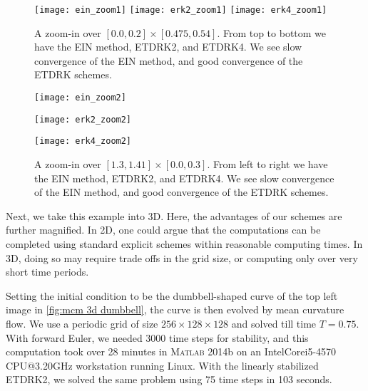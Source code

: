 \begin{figure}[htb!]
        \centering
\texttt{[image: ein\_zoom1]}
\texttt{[image: erk2\_zoom1]}
\texttt{[image: erk4\_zoom1]}
\caption[{A zoom-in over $ [0.0,0.2]\times [0.475,0.54]$ to inspect convergence.}]{A zoom-in over $[0.0, 0.2]\times [0.475, 0.54]$. From top to bottom we have the EIN method, ETDRK2, and ETDRK4. We see slow convergence of the EIN method, and good convergence of the ETDRK schemes.}
\label{fig:mcm zoom in 1}
\end{figure}

\begin{figure}[htb!]
        \centering
\begin{minipage}{0.30\textwidth}
        \texttt{[image: ein\_zoom2]}
\end{minipage}
\begin{minipage}{0.30\textwidth}
        \texttt{[image: erk2\_zoom2]}
\end{minipage}
\begin{minipage}{0.30\textwidth}
        \texttt{[image: erk4\_zoom2]}
\end{minipage}
\caption[{A zoom-in over $[1.3,1.41]\times [0.0, 0.3]$ to inspect convergence.}]{A zoom-in over $[1.3,1.41]\times [0.0, 0.3]$. From left to right we have the EIN method, ETDRK2, and ETDRK4. We see slow convergence of the EIN method, and good convergence of the ETDRK schemes.}
\label{fig:mcm zoom in 2}
\end{figure}

Next, we take this example into 3D. Here, the advantages of our schemes are further magnified. In 2D, one could argue that the computations can be completed using standard explicit schemes within reasonable computing times. In 3D, doing so may require trade offs in the grid size, or computing only over very short time periods. 

Setting the initial condition to be the dumbbell-shaped curve of the top left image in \cref{fig:mcm 3d dumbbell}, the curve is then evolved by mean curvature flow. We use a periodic grid of size $256\times 128\times 128$ and solved till time $T=0.75$. With forward Euler, we needed $3000$ time steps for stability, and this computation took over 28 minutes in \textsc{Matlab} 2014b on an Intel\textsuperscript{\textregistered}Core\textsuperscript{\texttrademark}i5-4570 CPU@3.20GHz workstation running Linux. With the linearly stabilized ETDRK2, we solved the same problem using 75 time steps in 103 seconds.

